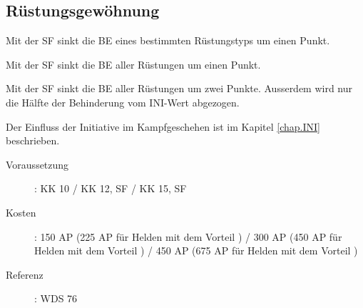 \subsection{Rüstungsgewöhnung}
\label{sf.ruestungsgewoehnung}
Mit der SF  sinkt die BE eines bestimmten Rüstungstyps um einen Punkt.

Mit der SF  sinkt die BE aller Rüstungen um einen Punkt.

Mit der SF  sinkt die BE aller Rüstungen um zwei Punkte.
Ausserdem wird nur die Hälfte der Behinderung vom INI-Wert abgezogen.

Der Einfluss der Initiative im Kampfgeschehen ist im Kapitel \ref{chap.INI} beschrieben.
\begin{description}
    \item[Voraussetzung]:
        KK 10 / KK 12, SF  / KK 15, SF 
    \item [Kosten]:
        150 AP (225 AP für Helden mit dem Vorteil ) / 300 AP (450 AP für Helden mit dem Vorteil ) / 450 AP (675 AP für Helden mit dem Vorteil )
    \item [Referenz]:
        WDS 76
\end{description}
